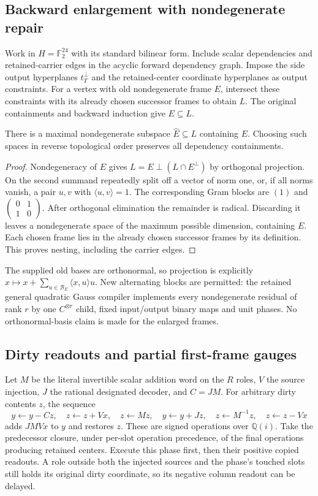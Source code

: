 \subsection{Backward enlargement with nondegenerate repair}
Work in $H=\mathbb F_2^{24}$ with its standard bilinear form.
Include scalar dependencies and retained-carrier edges in the acyclic
forward dependency graph. Impose the side output hyperplanes $t_T^\perp$
and the retained-center coordinate hyperplanes as output constraints.
For a vertex with old nondegenerate frame $E$, intersect these constraints
with its already chosen successor frames to obtain $L$. The original
containments and backward induction give $E\subseteq L$.

\begin{lemma}
There is a maximal nondegenerate subspace $\widehat E\subseteq L$
containing $E$. Choosing such spaces in reverse topological order preserves
all dependency containments.
\end{lemma}
\begin{proof}
Nondegeneracy of $E$ gives
$L=E\mathbin{\perp}(L\cap E^\perp)$ by orthogonal projection.
On the second summand repeatedly split off a vector of norm one, or, if
all norms vanish, a pair $u,v$ with $\langle u,v\rangle=1$.
The corresponding Gram blocks are $(1)$ and
$\left(\begin{smallmatrix}0&1\\1&0\end{smallmatrix}\right)$.
After orthogonal elimination the remainder is radical. Discarding it
leaves a nondegenerate space of the maximum possible dimension, containing
$E$. Each chosen frame lies in the already chosen successor frames by its
definition. This proves nesting, including the carrier edges.
\end{proof}
The supplied old bases are orthonormal, so projection is explicitly
$x\mapsto x+\sum_{u\in\mathcal B_E}\langle x,u\rangle u$.
New alternating blocks are permitted: the retained general quadratic
Gauss compiler implements every nondegenerate residual of rank $r$ by one
$C^{\otimes r}$ child, fixed input/output binary maps and unit phases.
No orthonormal-basis claim is made for the enlarged frames.

\subsection{Dirty readouts and partial first-frame gauges}
Let $M$ be the literal invertible scalar addition word on the $R$ roles,
$V$ the source injection, $J$ the rational designated decoder, and $C=JM$.
For arbitrary dirty contents $z$, the sequence
\[
 y\leftarrow y-Cz,\quad z\leftarrow z+Vx,\quad z\leftarrow Mz,
 \quad y\leftarrow y+Jz,\quad z\leftarrow M^{-1}z,
 \quad z\leftarrow z-Vx
\]
adds $JMVx$ to $y$ and restores $z$. These are signed operations over
$\mathbb Q(i)$. Take the predecessor closure, under per-slot operation
precedence, of the final operations producing retained centers. Execute
this phase first, then their positive copied readouts. A role outside both
the injected sources and the phase's touched slots still holds its
original dirty coordinate, so its negative column readout can be delayed.

